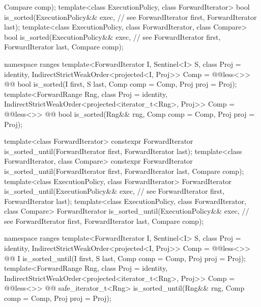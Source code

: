 \begin{codeblock}
                             Compare comp);
  template<class ExecutionPolicy, class ForwardIterator>
    bool is_sorted(ExecutionPolicy&& exec, // see 
                   ForwardIterator first, ForwardIterator last);
  template<class ExecutionPolicy, class ForwardIterator, class Compare>
    bool is_sorted(ExecutionPolicy&& exec, // see 
                   ForwardIterator first, ForwardIterator last,
                   Compare comp);
\end{codeblock}\begin{addedblock}\begin{codeblock}
  namespace ranges {
    template<ForwardIterator I, Sentinel<I> S, class Proj = identity,
        IndirectStrictWeakOrder<projected<I, Proj>> Comp = @@less<>>
      @@ bool is_sorted(I first, S last, Comp comp = Comp{}, Proj proj = Proj{});
    template<ForwardRange Rng, class Proj = identity,
        IndirectStrictWeakOrder<projected<iterator_t<Rng>, Proj>> Comp = @@less<>>
      @@ bool is_sorted(Rng&& rng, Comp comp = Comp{}, Proj proj = Proj{});
  }
\end{codeblock}\end{addedblock}\begin{codeblock}
  template<class ForwardIterator>
    constexpr ForwardIterator
      is_sorted_until(ForwardIterator first, ForwardIterator last);
  template<class ForwardIterator, class Compare>
    constexpr ForwardIterator
      is_sorted_until(ForwardIterator first, ForwardIterator last,
                      Compare comp);
  template<class ExecutionPolicy, class ForwardIterator>
    ForwardIterator
      is_sorted_until(ExecutionPolicy&& exec, // see 
                      ForwardIterator first, ForwardIterator last);
  template<class ExecutionPolicy, class ForwardIterator, class Compare>
    ForwardIterator
      is_sorted_until(ExecutionPolicy&& exec, // see 
                      ForwardIterator first, ForwardIterator last,
                      Compare comp);
\end{codeblock}\begin{addedblock}\begin{codeblock}
  namespace ranges {
    template<ForwardIterator I, Sentinel<I> S, class Proj = identity,
        IndirectStrictWeakOrder<projected<I, Proj>> Comp = @@less<>>
      @@ I is_sorted_until(I first, S last, Comp comp = Comp{}, Proj proj = Proj{});
    template<ForwardRange Rng, class Proj = identity,
        IndirectStrictWeakOrder<projected<iterator_t<Rng>, Proj>> Comp = @@less<>>
      @@ safe_iterator_t<Rng>
        is_sorted_until(Rng&& rng, Comp comp = Comp{}, Proj proj = Proj{});
  }
\end{codeblock}\end{addedblock}\begin{codeblock}


\end{codeblock}
